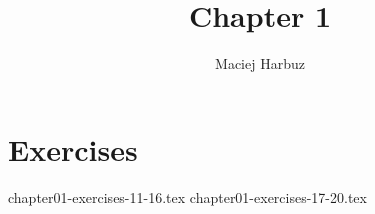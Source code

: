 \documentclass[12pt, a4paper]{article}
\title{Chapter 1}
\author{Maciej Harbuz}
\begin{document}
\maketitle

\section{Exercises}
%
{chapter01-exercises-11-16.tex}
{chapter01-exercises-17-20.tex}
\end{document}
